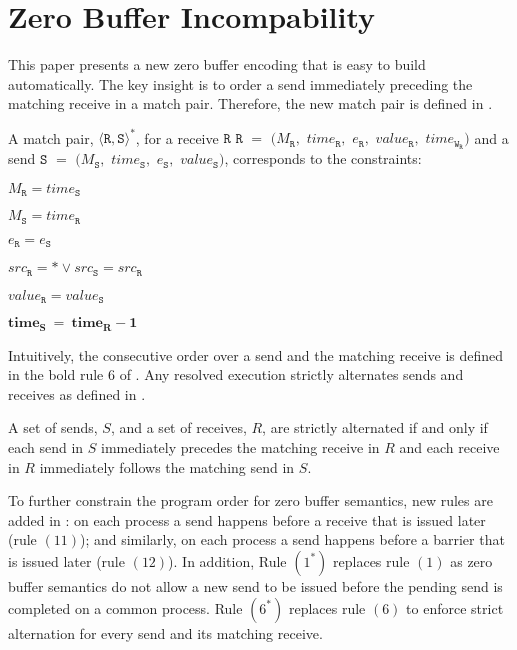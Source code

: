 \section{Zero Buffer Incompability}
This paper presents a new zero buffer encoding that is easy to build automatically. 
The key insight is to order a send immediately preceding the matching receive in a match pair. Therefore, the new match pair is defined in .

\begin{definition} \label{def:match*}
A match pair, $\langle\mathtt{R}, \mathtt{S}\rangle^*$, for a receive
$\mathtt{R}$ $\mathtt{R}$ $=$ $(M_\mathtt{R},$ $\mathit{time}_\mathtt{R},$ $e_\mathtt{R},$ $\mathit{value}_\mathtt{R},$ $\mathit{time}_{\mathtt{W}_\mathtt{R}})$ and a send $\mathtt{S}$ $=$ $(M_\mathtt{S},$ $\mathit{time}_\mathtt{S},$ $e_\mathtt{S},$ $\mathit{value}_\mathtt{S})$, corresponds to the constraints:
\begin{compactenum}
\item $M_{\mathtt{R}} = \mathit{time}_{\mathtt{S}}$
\item $M_{\mathtt{S}} = \mathit{time}_{\mathtt{R}}$
\item $e_{\mathtt{R}} = e_{\mathtt{S}}$
\item $src_\mathtt{R} = \ast \vee src_\mathtt{S} = src_\mathtt{R}$
\item $\mathit{value}_{\mathtt{R}} = \mathit{value}_{\mathtt{S}}$ 
\item $\mathit{\textbf{time}}_{\mathtt{\textbf{S}}}\ = \ \mathit{\textbf{time}}_{\mathtt{\textbf{R}}} - \mathit{\textbf{1}}$
\end{compactenum}
\end{definition}

Intuitively, the consecutive order over a send and the matching receive is defined in the bold rule $6$ of . Any resolved execution strictly alternates sends and receives as defined in .

\begin{definition}\label{def:alternate}
A set of sends, $S$, and a set of receives, $R$, are strictly alternated if and only if each send in $S$ immediately precedes the matching receive in $R$ and each receive in $R$ immediately follows the matching send in $S$.
\end{definition}
To further constrain the program order for zero buffer semantics, new rules are added in : on each process a send happens before a receive that is issued later (rule $(11)$); and similarly, on each process a send happens before a barrier that is issued later (rule $(12)$). In addition, Rule $(1^*)$ replaces rule $(1)$ as zero buffer semantics do not allow a new send to be issued before the pending send is completed on a common process. Rule $(6^*)$ replaces rule $(6)$ to enforce strict alternation for every send and its matching receive.

